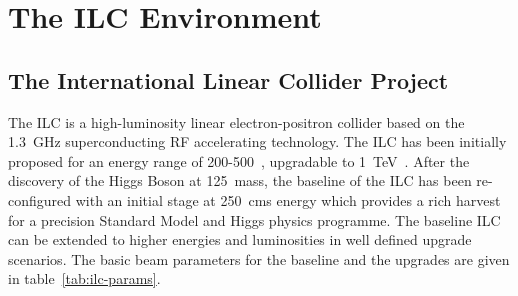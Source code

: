 \chapter{The ILC Environment}

\section{The International Linear Collider Project}
The ILC is a high-luminosity linear electron-positron collider based on the 1.3~GHz superconducting RF accelerating technology. The ILC has been initially proposed for an energy range of 200-500~\GeV, upgradable to 1~TeV~\cite{Behnke:2013xla}. After the discovery of the Higgs Boson at 125~\GeV mass, the baseline of the ILC has been re-configured with an initial stage at 250~\GeV cms energy which provides a rich harvest for a precision Standard Model and Higgs physics programme. The baseline ILC can be extended to higher energies and luminosities in well defined upgrade scenarios. The basic beam parameters for the baseline and the upgrades are given in table~\ref{tab:ilc-params}.

